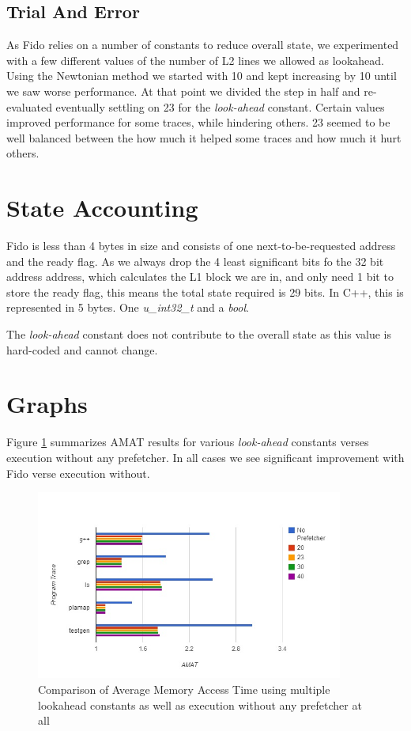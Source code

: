 \documentclass[11pt]{article}
\begin{document}
\subsection{Trial And Error}
As Fido relies on a number of constants to reduce overall state, we experimented with a few different values of the number of L2 lines we allowed as lookahead. Using the Newtonian method we started with 10 and kept increasing by 10 until we saw worse performance. At that point we divided the step in half and re-evaluated eventually settling on 23 for the \textit{look-ahead} constant. Certain values improved performance for some traces, while hindering others. 23 seemed to be well balanced between the how much it helped some traces and how much it hurt others.  

\section{State Accounting}
Fido is less than 4 bytes in size and consists of one next-to-be-requested address and the ready flag. As we always drop the 4 least significant bits fo the 32 bit address address, which calculates the L1 block we are in, and only need 1 bit to store the ready flag, this means the total state required is 29 bits. In C++, this is represented in 5 bytes. One \textit{u\_int32\_t} and a \textit{bool}. 

The \textit{look-ahead} constant does not contribute to the overall state as this value is hard-coded and cannot change. 

\section{Graphs}
Figure \ref{AMAT} summarizes AMAT results for various \textit{look-ahead} constants verses execution without any prefetcher. In all cases we see significant improvement with Fido verse execution without. 

\begin{figure}[H]

\centering
\includegraphics[width=0.9\textwidth]{AMAT.jpg}
\caption{ \label{AMAT} Comparison of Average Memory Access Time using multiple lookahead constants as well as execution without any prefetcher at all }
\end{figure}
\end{document}
